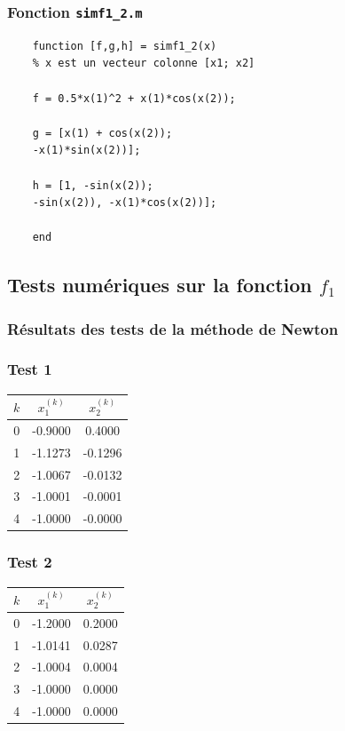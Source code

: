 \documentclass[a4paper,12pt]{article}
\begin{document}
	\subsubsection{Fonction \texttt{simf1\_2.m}}
	
	\begin{verbatim}
	function [f,g,h] = simf1_2(x)
	% x est un vecteur colonne [x1; x2]
	
	f = 0.5*x(1)^2 + x(1)*cos(x(2));
	
	g = [x(1) + cos(x(2));
	-x(1)*sin(x(2))];
	
	h = [1, -sin(x(2));
	-sin(x(2)), -x(1)*cos(x(2))];
	
	end
	\end{verbatim}
	
	\subsection{Tests numériques sur la fonction \(f_1\)}
	
	\subsubsection{Résultats des tests de la méthode de Newton}
	
	\subsubsection*{Test 1}
	\begin{center}
		\begin{tabular}{ccc}
			\toprule
			$k$ & $x_1^{(k)}$ & $x_2^{(k)}$ \\
			\midrule
			0 & -0.9000 & 0.4000 \\
			1 & -1.1273 & -0.1296 \\
			2 & -1.0067 & -0.0132 \\
			3 & -1.0001 & -0.0001 \\
			4 & -1.0000 & -0.0000 \\
			\bottomrule
		\end{tabular}
	\end{center}
	
	\subsubsection*{Test 2}
	\begin{center}
		\begin{tabular}{ccc}
			\toprule
			$k$ & $x_1^{(k)}$ & $x_2^{(k)}$ \\
			\midrule
			0 & -1.2000 & 0.2000 \\
			1 & -1.0141 & 0.0287 \\
			2 & -1.0004 & 0.0004 \\
			3 & -1.0000 & 0.0000 \\
			4 & -1.0000 & 0.0000 \\
			\bottomrule
		\end{tabular}
	\end{center}
	
\end{document}
